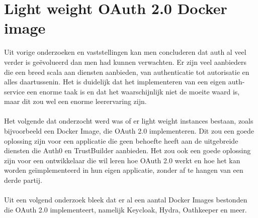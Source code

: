 \section{Light weight OAuth 2.0 Docker image}%
\label{sec:light-weight-oauth-2.0-docker-image}
Uit vorige onderzoeken en vaststellingen kan men concluderen dat \gls{auth} al veel verder is geëvolueerd dan men had kunnen verwachten. Er zijn veel aanbieders die een breed scala aan diensten aanbieden, van authenticatie tot autorisatie en alles daartussenin. Het is duidelijk dat het implementeren van een eigen \gls{auth}-service een enorme taak is en dat het waarschijnlijk niet de moeite waard is, maar dit zou wel een enorme leerervaring zijn.
\\
\\
Het volgende dat onderzocht werd was of er light weight instances bestaan, zoals bijvoorbeeld een Docker Image, die OAuth 2.0 implementeren. Dit zou een goede oplossing zijn voor een applicatie die geen behoefte heeft aan de uitgebreide diensten die Auth0 en TrustBuilder aanbieden. Het zou ook een goede oplossing zijn voor een ontwikkelaar die wil leren hoe OAuth 2.0 werkt en hoe het kan worden geïmplementeerd in hun eigen applicatie, zonder af te hangen van een derde partij.
\\
\\
Uit een volgend onderzoek bleek dat er al een aantal Docker Images bestonden die OAuth 2.0 implementeert, namelijk Keycloak, Hydra, Oathkeeper en meer.
